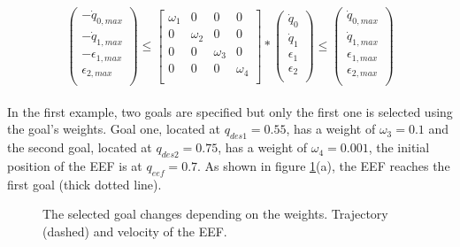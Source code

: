 $$
\left( \begin{array}{c}
-\dot{q}_{0,max} \\
-\dot{q}_{1,max} \\
-\epsilon_{1,max} \\
\epsilon_{2,max} \\
\end{array}
\right)	\leq 
\left[ \begin{array}{cccc}
\omega_{1} & 0 & 0 & 0 \\
0 & \omega_{2} & 0 & 0 \\
0 & 0 & \omega_{3} & 0 \\
0 & 0 & 0 & \omega_{4} \\
\end{array}
\right] *
\left( \begin{array}{c}
\dot{q}_{0} \\
\dot{q}_{1} \\
\epsilon_1 \\
\epsilon_2 \\
\end{array}
\right) 
\leq \left( \begin{array}{c}
\dot{q}_{0,max} \\
\dot{q}_{1,max} \\
\epsilon_{1,max} \\
\epsilon_{2,max} \\
\end{array}
\right)
$$
\\
In the first example, two goals are specified but only the first one is selected using the goal's weights. Goal one, located at $q_{des1} = 0.55$, has a weight of $\omega_{3} = 0.1$ and the second goal, located at $q_{des2} = 0.75$, has a weight of $\omega_{4} = 0.001$, the initial position of the EEF is at $q_{eef} = 0.7$. As shown in figure \ref{fig:goal1}(a), the EEF reaches the first goal (thick dotted line).

\begin{figure}[H]
	\centering
	\begin{subfigure}[First Goal]
		{\texttt{[image: controllers/multip\_1.png]}}
	\end{subfigure}
	\begin{subfigure}[Second goal]
		{\texttt{[image: controllers/multip\_2.png]}}
	\end{subfigure}
	\vspace{-12pt}
	\caption[Multiple goals]{The selected goal changes depending on the weights. Trajectory (dashed) and velocity of the EEF.}
	\vspace{-10pt}
	\label{fig:goal1}
\end{figure}

